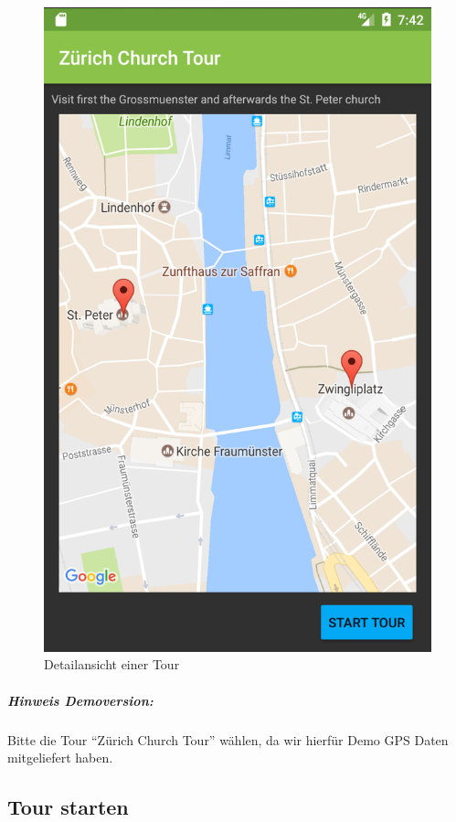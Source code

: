\documentclass[a4paper,10pt,xetex]{article}
\begin{document}
\begin{figure}
\begin{minipage}[b]{0.48\textwidth}
    \includegraphics[width=\textwidth]{screenshots/DetailActivity}
    \caption{Detailansicht einer Tour}
    \label{fig:detail-activity}
  \end{minipage}
\end{figure}

\subparagraph{Hinweis Demoversion:}
Bitte die Tour ``Zürich Church Tour'' wählen, da wir hierfür Demo GPS Daten mitgeliefert haben.

\subsection{Tour starten}
\end{document}
